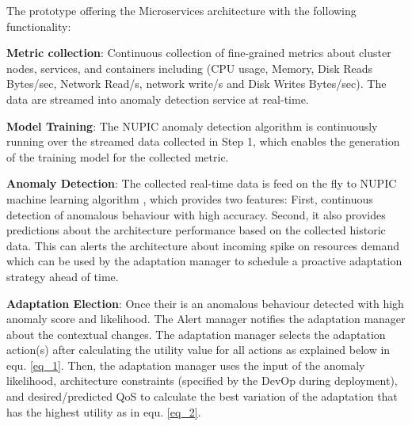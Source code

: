 \documentclass[sigconf]{acmart}
\begin{document}
The prototype offering the Microservices architecture with the following functionality: 

\textbf{Metric collection}: Continuous collection of fine-grained metrics about cluster nodes, services, and containers including (CPU usage, Memory, Disk Reads Bytes/sec, Network Read/s, network write/s and Disk Writes Bytes/sec). The data are streamed into anomaly detection service at real-time. 

\textbf{Model Training}: The NUPIC anomaly detection algorithm is continuously running over the streamed data collected in Step 1, which enables the generation of the training model for the collected metric. 

\textbf{Anomaly Detection}: The collected real-time data is feed on the fly to NUPIC machine learning algorithm \cite{AHMAD2017134}, which provides two features: First, continuous detection of anomalous behaviour with high accuracy. Second, it also provides predictions about the architecture performance based on the collected historic data. This can alerts the architecture about incoming spike on resources demand which can be used by the adaptation manager to schedule a proactive adaptation strategy ahead of time. 

\textbf{Adaptation Election}: Once their is an anomalous behaviour detected with high anomaly score and likelihood. The Alert manager notifies the adaptation manager about the contextual changes. The adaptation manager selects the adaptation action(s) after calculating the utility value for all actions as explained below in equ. \ref{eq_1}. Then, the adaptation manager uses the input of the anomaly likelihood, architecture constraints (specified by the DevOp during deployment), and desired/predicted QoS to calculate the best variation of the adaptation that has the highest utility as in equ. \ref{eq_2}. 
\end{document}
